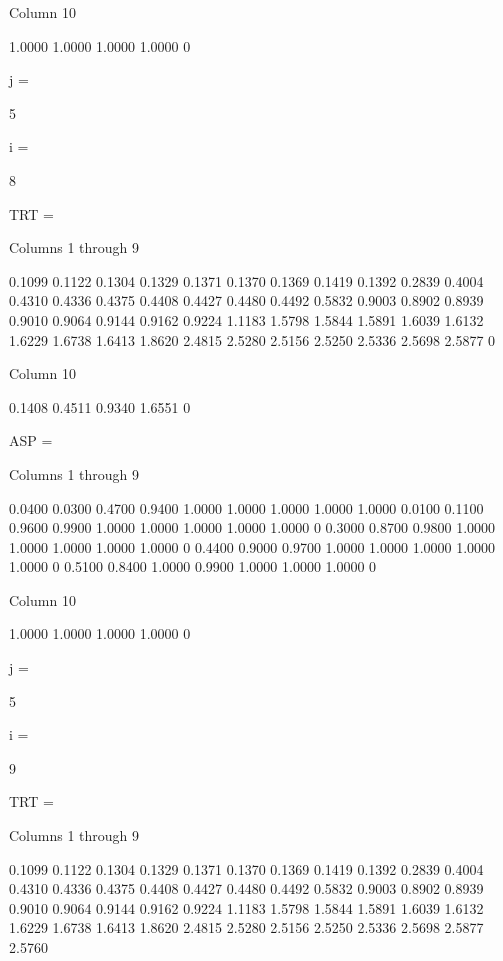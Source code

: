   Column 10

    1.0000
    1.0000
    1.0000
    1.0000
         0


j =

     5


i =

     8


TRT =

  Columns 1 through 9

    0.1099    0.1122    0.1304    0.1329    0.1371    0.1370    0.1369    0.1419    0.1392
    0.2839    0.4004    0.4310    0.4336    0.4375    0.4408    0.4427    0.4480    0.4492
    0.5832    0.9003    0.8902    0.8939    0.9010    0.9064    0.9144    0.9162    0.9224
    1.1183    1.5798    1.5844    1.5891    1.6039    1.6132    1.6229    1.6738    1.6413
    1.8620    2.4815    2.5280    2.5156    2.5250    2.5336    2.5698    2.5877         0

  Column 10

    0.1408
    0.4511
    0.9340
    1.6551
         0


ASP =

  Columns 1 through 9

    0.0400    0.0300    0.4700    0.9400    1.0000    1.0000    1.0000    1.0000    1.0000
    0.0100    0.1100    0.9600    0.9900    1.0000    1.0000    1.0000    1.0000    1.0000
         0    0.3000    0.8700    0.9800    1.0000    1.0000    1.0000    1.0000    1.0000
         0    0.4400    0.9000    0.9700    1.0000    1.0000    1.0000    1.0000    1.0000
         0    0.5100    0.8400    1.0000    0.9900    1.0000    1.0000    1.0000         0

  Column 10

    1.0000
    1.0000
    1.0000
    1.0000
         0


j =

     5


i =

     9


TRT =

  Columns 1 through 9

    0.1099    0.1122    0.1304    0.1329    0.1371    0.1370    0.1369    0.1419    0.1392
    0.2839    0.4004    0.4310    0.4336    0.4375    0.4408    0.4427    0.4480    0.4492
    0.5832    0.9003    0.8902    0.8939    0.9010    0.9064    0.9144    0.9162    0.9224
    1.1183    1.5798    1.5844    1.5891    1.6039    1.6132    1.6229    1.6738    1.6413
    1.8620    2.4815    2.5280    2.5156    2.5250    2.5336    2.5698    2.5877    2.5760

